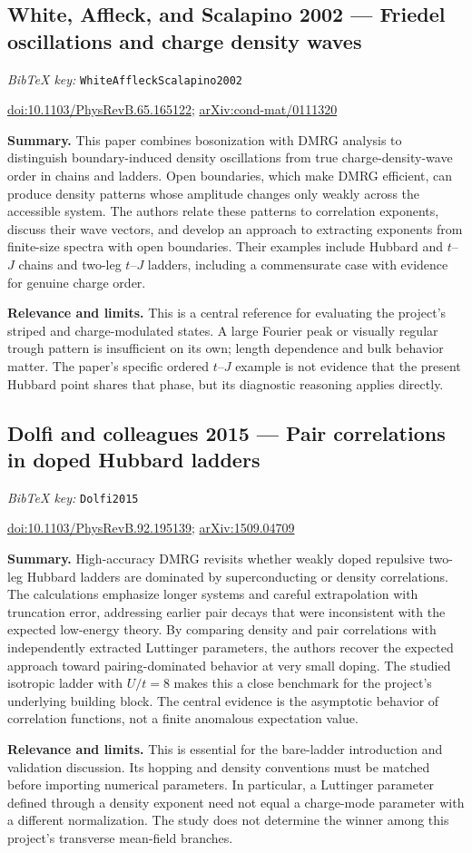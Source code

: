 \documentclass[11pt]{article}
\newcommand{\paper}[2]{\Needspace{8\baselineskip}\subsection{#2}\label{paper:#1}\textit{BibTeX key:} \texttt{#1}\quad\citep{#1}\par}
\newcommand{\doi}[1]{\href{https://doi.org/#1}{doi:#1}}
\newcommand{\arxiv}[1]{\href{https://arxiv.org/abs/#1}{arXiv:#1}}
\newcommand{\summary}{\par\textbf{Summary.} }
\newcommand{\relevance}{\par\textbf{Relevance and limits.} }
\begin{document}
\paper{WhiteAffleckScalapino2002}{White, Affleck, and Scalapino 2002 --- Friedel oscillations and charge density waves}
\doi{10.1103/PhysRevB.65.165122}; \arxiv{cond-mat/0111320}
\summary This paper combines bosonization with DMRG analysis to distinguish boundary-induced density oscillations from true charge-density-wave order in chains and ladders. Open boundaries, which make DMRG efficient, can produce density patterns whose amplitude changes only weakly across the accessible system. The authors relate these patterns to correlation exponents, discuss their wave vectors, and develop an approach to extracting exponents from finite-size spectra with open boundaries. Their examples include Hubbard and $t$--$J$ chains and two-leg $t$--$J$ ladders, including a commensurate case with evidence for genuine charge order.
\relevance This is a central reference for evaluating the project's striped and charge-modulated states. A large Fourier peak or visually regular trough pattern is insufficient on its own; length dependence and bulk behavior matter. The paper's specific ordered $t$--$J$ example is not evidence that the present Hubbard point shares that phase, but its diagnostic reasoning applies directly.

\paper{Dolfi2015}{Dolfi and colleagues 2015 --- Pair correlations in doped Hubbard ladders}
\doi{10.1103/PhysRevB.92.195139}; \arxiv{1509.04709}
\summary High-accuracy DMRG revisits whether weakly doped repulsive two-leg Hubbard ladders are dominated by superconducting or density correlations. The calculations emphasize longer systems and careful extrapolation with truncation error, addressing earlier pair decays that were inconsistent with the expected low-energy theory. By comparing density and pair correlations with independently extracted Luttinger parameters, the authors recover the expected approach toward pairing-dominated behavior at very small doping. The studied isotropic ladder with $U/t=8$ makes this a close benchmark for the project's underlying building block. The central evidence is the asymptotic behavior of correlation functions, not a finite anomalous expectation value.
\relevance This is essential for the bare-ladder introduction and validation discussion. Its hopping and density conventions must be matched before importing numerical parameters. In particular, a Luttinger parameter defined through a density exponent need not equal a charge-mode parameter with a different normalization. The study does not determine the winner among this project's transverse mean-field branches.
\end{document}
